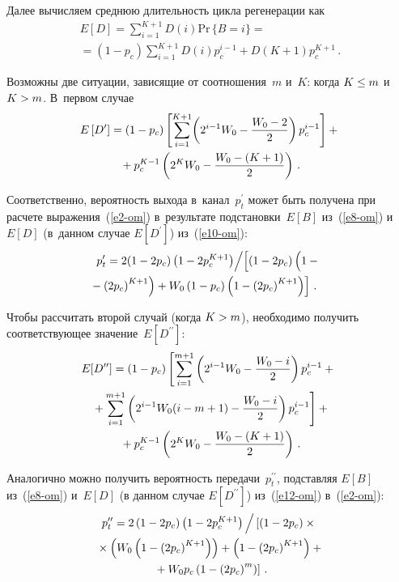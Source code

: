 \begin{multicols}{2}
    Далее вычисляем среднюю длительность цикла регенерации как
    \begin{multline*}
    E[D]= \sum\limits_{i=1}^{K+1} D(i) \mathrm{Pr}\,\{B=i\} = {}\\
    {}=\left(1-p_c\right) 
\sum\limits_{i=1}^{K+1} D(i) p_c^{i-1} +D(K+1) p_c^{K+1}\,.
    \end{multline*}
    
    Возможны две ситуации, зависящие от соотношения~$m$ и~$K$: 
когда $K\hm\leq m$ и~$K\hm>m$. В~первом случае
    \begin{multline}
    E\left[ D^\prime\right] = (1-p_c) \left[ \sum\limits_{i=1}^{K+1}\! \left( 
2^{i-1} W_0 -\displaystyle\frac{\displaystyle W_0-2\mathstrut}{\displaystyle 2\mathstrut}\right) p_c^{i-1}\right] +{}\\
{}+
    p_c^{K-1} \left( 2^K W_0 -\displaystyle\frac{\displaystyle W_0-(K+1)\mathstrut}{\displaystyle 2\mathstrut}\right)\,.
    \label{e10-om}
    \end{multline}
    
    Соответственно, вероятность выхода в~канал~$p^\prime_t$ может 
быть получена при расчете выражения~(\ref{e2-om}) в~результате 
подстановки~$E[B]$ из~(\ref{e8-om}) и~$E[D]$ (в~данном случае 
$E[D^\prime]$) из~(\ref{e10-om}):
    \begin{multline}
    p^\prime_t = 2(1-2p_c) \left(1-2p_c^{K+1}\right)\!\Big /\!
    \left[ \left(1-2p_c\right) 
\left( \vphantom{\left(2p_c\right)^{K+1}}
1-{}\right.\right.\\
\hspace*{-5mm}\left.\left.{}-\left(2p_c\right)^{K+1}\right) 
+ W_0 \left(1-p_c\right) \left(1-\left(2p_c\right)^{K+1}\right)\right]\,.
    \label{e11-om}
    \end{multline}
    
    Чтобы рассчитать второй случай (когда $K\hm>m$), необходимо 
получить соответствующее значение~$E[D^{\prime\prime}]$:
    \begin{multline}
   \! E[D^{\prime\prime}] = (1-p_c) \left[ \sum\limits_{i=1}^{m+1} \left( 
2^{i-1}W_0 -\displaystyle\frac{\displaystyle W_0-i\mathstrut}{\displaystyle 2\mathstrut}\right) p_c^{i-1}+ {}\right.\\
\left.{}+
    \sum\limits_{i=1}^{m+1} \left( 2^{i-1}W_0(i-m+1)-\displaystyle\frac{\displaystyle W_0-i\mathstrut}{\displaystyle 2\mathstrut}\right) 
p_c^{i-1}\right] + {}\\
{}+p_c^{K-1} \left( 2^KW_0 - \displaystyle\frac{\displaystyle W_0-(K+1)\mathstrut}{\displaystyle 2\mathstrut}\right)\,.
\label{e12-om}
    \end{multline}
     
     Аналогично можно получить вероятность 
передачи~$p^{\prime\prime}_t$, подставляя $E[B]$ из~(\ref{e8-om}) 
и~$E[D]$ (в данном случае $E[D^{\prime\prime}]$) из~(\ref{e12-om}) 
в~(\ref{e2-om}):
    \begin{multline}
    p^{\prime\prime}_t =   2\left(1-2p_c\right)\left(1-2p_c^{K+1}\right)\Big / 
    \left[ \vphantom{\left(2p_c\right)^m}
    (1-2p_c)\times{}\right.\\
   {}\times 
\left(W_0\left(1-\left(2p_c\right)^{K+1}\right)\right)+
\left(1-\left(2p_c\right)^{K+1}\right) +{}\\
\left. {}+W_0 p_c\left(1-\left(2p_c\right)^m\right)\right]\,.
    \label{e13-om}
    \end{multline}
    

\end{multicols}
